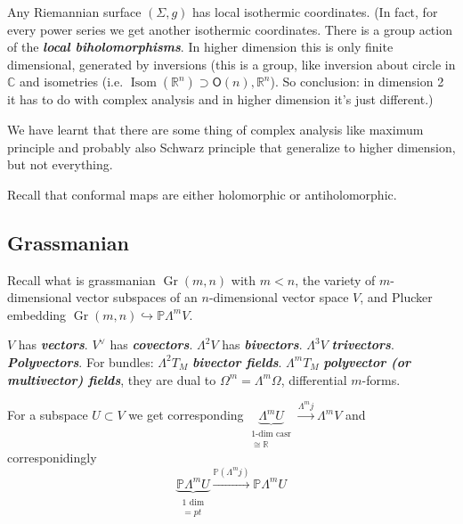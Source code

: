 \begin{claim}\leavevmode
Any Riemannian surface \((\Sigma,g)\) has local isothermic coordinates. (In fact, for every power series we get another isothermic coordinates. There is a group action of the \textit{\textbf{local biholomorphisms}}. In higher dimension this is only finite dimensional, generated by inversions (this is a group, like inversion about circle in \(\mathbb{C}\) and isometries (i.e. \(\operatorname{Isom}(\mathbb{R}^n) \supset\mathsf{O}(n),\mathbb{R}^n\)). So conclusion: in dimension 2 it has to do with complex analysis and in higher dimension it's just different.)
\end{claim}

\begin{thing7}{We have learnt}\leavevmode
that there are some thing of complex analysis like maximum principle and probably also Schwarz principle that generalize to higher dimension, but not everything.
\end{thing7}

\begin{remark}\leavevmode
Recall that conformal maps are either holomorphic or antiholomorphic.
\end{remark}

\subsection{Grassmanian}

Recall what is grassmanian \(\operatorname{Gr}(m,n)\) with \(m<n\), the variety of \(m\)-dimensional vector subspaces of an \(n\)-dimensional vector space \(V\), and Plucker embedding \(\operatorname{Gr}(m,n)\hookrightarrow \mathbb{P}\Lambda^{m}V\).


\begin{defn}\leavevmode
\(V\) has \textit{\textbf{vectors}}. \(V^\vee\) has \textit{\textbf{covectors}}.  \(\Lambda^{2}V\) has \textit{\textbf{bivectors}}.  \(\Lambda^{3}V\) \textit{\textbf{trivectors}}.  \textit{\textbf{Polyvectors}}. For bundles:  \(\Lambda^{2}T_M\) \textit{\textbf{bivector fields}}.  \(\Lambda^{m}T_M\) \textit{\textbf{polyvector (or multivector) fields}}, they are dual to  \(\Omega^{m}=\Lambda^{m}\Omega\), differential \(m\)-forms.
\end{defn}
For a subspace \(U \subset V\) we get corresponding \(\underbrace{\Lambda^{m}U }_{\substack{\text{1-dim casr}  \\ \cong\mathbb{R}}}\xrightarrow{\Lambda^{m}j}\Lambda^{m}V\)
and corresponidingly
\[\underbrace{\mathbb{P}\Lambda^{m}U}_{\substack{\text{1 dim}  \\ =pt}}\xrightarrow{\mathbb{P}(\Lambda^{m}j)}\mathbb{P}\Lambda^{m}U\]

